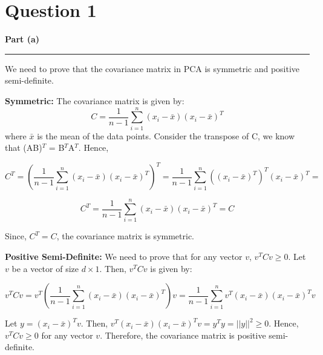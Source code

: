 \documentclass[a4paper,12pt]{article}
\title{\cooltitle{CS663 Assignment-4}}
\author{{\bf Saksham Rathi, Kavya Gupta, Shravan Srinivasa Raghavan} \\
\small Department of Computer Science, \\
Indian Institute of Technology Bombay \\}
\date{}
\newenvironment{solution}[2][]{%
    \begin{mdframed}[linecolor=blue!70!black, linewidth=2pt, roundcorner=10pt, backgroundcolor=yellow!10!white, skipabove=12pt, skipbelow=12pt]%
        \textbf{\large #2}
        \par\noindent\rule{\textwidth}{0.4pt}
}{
    \end{mdframed}
}
\begin{document}
\maketitle

\section*{Question 1}

\begin{solution}{Part (a)}
We need to prove that the covariance matrix in PCA is symmetric and positive semi-definite.

\textbf{Symmetric:} The covariance matrix is given by:
\begin{equation}
  C = \frac{1}{n-1} \sum_{i=1}^{n} (x_i - \bar{x})(x_i - \bar{x})^T
\end{equation}
where $\bar{x}$ is the mean of the data points. Consider the transpose of C, we know that (AB)$^T$ = B$^T$A$^T$. Hence,

\begin{equation}
  C^T = \left(\frac{1}{n-1} \sum_{i=1}^{n} (x_i - \bar{x})(x_i - \bar{x})^T\right)^T = \frac{1}{n-1} \sum_{i=1}^{n} ((x_i - \bar{x})^T)^T(x_i - \bar{x})^T = 
\end{equation}

\begin{equation}
  C^T = \frac{1}{n-1} \sum_{i=1}^{n} (x_i - \bar{x})(x_i - \bar{x})^T = C
\end{equation}

Since, $C^T = C$, the covariance matrix is symmetric.

\textbf{Positive Semi-Definite:} We need to prove that for any vector $v$, $v^TCv \geq 0$. Let $v$ be a vector of size $d \times 1$. Then, $v^TCv$ is given by:

\begin{equation}
  v^TCv = v^T\left(\frac{1}{n-1} \sum_{i=1}^{n} (x_i - \bar{x})(x_i - \bar{x})^T\right)v = \frac{1}{n-1} \sum_{i=1}^{n} v^T(x_i - \bar{x})(x_i - \bar{x})^Tv
\end{equation}

Let $y = (x_i - \bar{x})^Tv$. Then, $v^T(x_i - \bar{x})(x_i - \bar{x})^Tv = y^Ty = ||y||^2 \geq 0$. Hence, $v^TCv \geq 0$ for any vector $v$. Therefore, the covariance matrix is positive semi-definite.
\end{solution}
\end{document}
